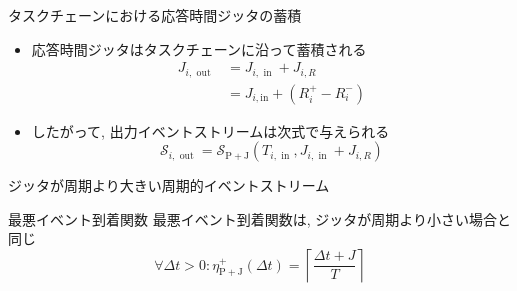 \begin{frame}{タスクチェーンにおける応答時間ジッタの蓄積}
    \begin{itemize}
        \item 応答時間ジッタはタスクチェーンに沿って蓄積される
              \begin{equation*}
                  \begin{aligned}
                      J_{i, \text { out }} & =J_{i, \text { in }}+J_{i, R}                        \\
                                           & =J_{i, \mathrm{in}}+\left(R_{i}^{+}-R_{i}^{-}\right)
                  \end{aligned}
              \end{equation*}

        \item したがって, 出力イベントストリームは次式で与えられる
              \begin{equation*}
                  \mathcal{S}_{i, \text { out }}=\mathcal{S}_{\mathrm{P}+\mathrm{J}}\left(T_{i, \text { in }}, J_{i, \text { in }}+J_{i, R}\right)
              \end{equation*}
    \end{itemize}
\end{frame}


\begin{frame}{}
\end{frame}

\begin{frame}{ジッタが周期より大きい周期的イベントストリーム}
\end{frame}

\begin{frame}{最悪イベント到着関数}
    最悪イベント到着関数は, ジッタが周期より小さい場合と同じ
    \begin{equation*}
        \forall \Delta t>0: \eta_{\mathrm{P}+\mathrm{J}}^{+}(\Delta t)=\left\lceil\frac{\Delta t+J}{T}\right\rceil
    \end{equation*}
\end{frame}

